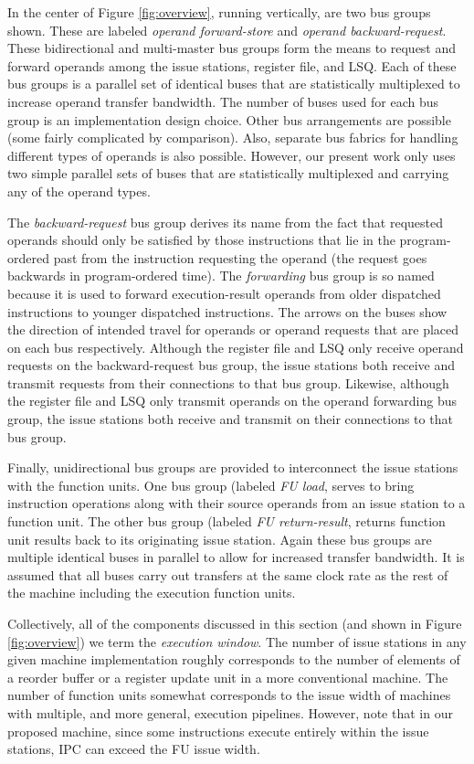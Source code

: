 \documentclass[10pt,dvips]{article}
\begin{document}
In the center of Figure \ref{fig:overview},
running vertically, are two bus groups shown.
These are labeled \textit{operand forward-store} and
\textit{operand backward-request}.
These bidirectional and multi-master bus groups
form the means to request and forward operands
among the issue stations, register file, and LSQ.
Each of these bus groups is a parallel set of identical buses
that are statistically multiplexed to increase operand transfer
bandwidth.  The number of buses used for each bus group is
an implementation design choice.
Other bus arrangements are possible (some fairly complicated by
comparison).  
Also, separate bus fabrics for handling
different types of operands is also possible.
However, our present work only uses two simple parallel
sets of buses that are statistically multiplexed and carrying
any of the operand types.

The \textit{backward-request} bus group
derives its name from the fact that requested operands should
only be satisfied by those instructions that lie in the program-ordered
past from the instruction requesting the operand (the request goes
backwards in program-ordered time).
The \textit{forwarding} bus group is so named because it is used
to forward execution-result operands from older dispatched
instructions to younger dispatched instructions.
The arrows on the buses show the direction of intended travel
for operands or operand requests that are placed on each bus
respectively.  Although the register file and LSQ only receive
operand requests on the backward-request bus group, the issue stations
both receive and transmit requests from their connections to that
bus group.  Likewise, although the register file and LSQ only transmit
operands on the operand forwarding bus group, the issue stations
both receive and transmit on their connections to that bus group.

Finally, unidirectional bus groups are provided to interconnect
the issue stations with the function units.
One bus group (labeled \textit{FU load}, serves to bring instruction
operations along with their source operands from an issue
station to a function unit.
The other bus group (labeled \textit{FU return-result},
returns function unit results back to its
originating issue station.
Again these bus groups are multiple identical buses in
parallel to allow for increased transfer bandwidth.
It is assumed that all buses carry out transfers at the same
clock rate as the rest of the machine including the execution
function units.

Collectively, all of the components discussed in this section
(and shown in 
Figure \ref{fig:overview}) we term the \textit{execution window}.
The number of issue stations in
any given machine implementation roughly corresponds to the
number of elements of a reorder buffer or a register update unit
in a more conventional machine.
The number of function units somewhat corresponds to the
issue width of machines with multiple, and more general, execution pipelines.
However, note that in our proposed machine, since some instructions
execute entirely within the issue stations, IPC can exceed the FU
issue width.
%
\end{document}
